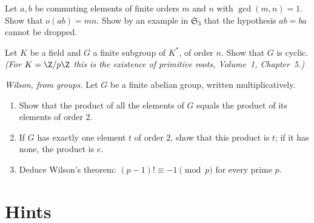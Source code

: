 \begin{exercise}[$\star\star$]\label{ex:prodorder}
Let $a,b$ be commuting elements of finite orders $m$ and $n$ with $\gcd(m,n)=1$. Show that $o(ab)=mn$. Show by an example in $\mathfrak S_3$ that the hypothesis $ab=ba$ cannot be dropped.
\end{exercise}

\begin{exercise}[$\star\star\star$]\label{ex:fieldcyclic}
Let $K$ be a field and $G$ a finite subgroup of $K^*$, of order $n$. Show that $G$ is cyclic. \emph{(For $K=\Z/p\Z$ this is the existence of primitive roots, Volume~1, Chapter~5.)}
\end{exercise}

\begin{exercise}[$\star\star\star$]\label{ex:wilson}
\emph{Wilson, from groups.} Let $G$ be a finite abelian group, written multiplicatively.
\begin{enumerate}[label=(\alph*)]
\item Show that the product of all the elements of $G$ equals the product of its elements of order $2$.
\item If $G$ has exactly one element $t$ of order $2$, show that this product is $t$; if it has none, the product is $e$.
\item Deduce Wilson's theorem: $(p-1)!\equiv-1\pmod p$ for every prime $p$.
\end{enumerate}
\end{exercise}

\section{Hints}

